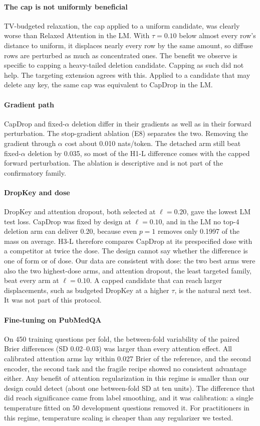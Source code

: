 \paragraph{The cap is not uniformly beneficial}
TV-budgeted relaxation, the cap applied to a uniform candidate, was clearly worse than Relaxed Attention in the LM.
With $\tau=0.10$ below almost every row's distance to uniform, it displaces nearly every row by the same amount, so
diffuse rows are perturbed as much as concentrated ones. The benefit we observe is specific to capping a heavy-tailed
deletion candidate. Capping as such did not help. The targeting extension agrees with this. Applied to a candidate that may delete
any key, the same cap was equivalent to CapDrop in the LM.

\paragraph{Gradient path}
CapDrop and fixed-$\alpha$ deletion differ in their gradients as well as in their forward perturbation. The stop-gradient ablation
(E8) separates the two. Removing the gradient through $\alpha$ cost about 0.010 nats/token. The detached arm still beat fixed-$\alpha$
deletion by 0.035, so most of the H1-L difference comes with the capped forward perturbation. The ablation is descriptive and
is not part of the confirmatory family.

\paragraph{DropKey and dose}
DropKey and attention dropout, both selected at $\ell=0.20$, gave the lowest LM test loss. CapDrop was fixed by
design at $\ell=0.10$, and in the LM no top-4 deletion arm can deliver 0.20, because even $p=1$ removes only 0.1997
of the mass on average. H3-L therefore compares CapDrop at its prespecified dose with a competitor at twice the
dose. The design cannot say whether the difference is one of form or of dose. Our data are consistent with dose: the two best arms were also the two highest-dose arms, and attention
dropout, the least targeted family, beat every arm at $\ell=0.10$. A capped candidate
that can reach larger displacements, such as budgeted DropKey at a higher $\tau$, is the natural next test. It was not part of
this protocol.

\paragraph{Fine-tuning on PubMedQA}
On 450 training questions per fold, the between-fold variability of the paired Brier differences (SD 0.02--0.03) was
larger than every attention effect. All calibrated attention arms lay within 0.027 Brier of the reference, and the
second encoder, the second task and the fragile recipe showed no consistent advantage either. Any benefit of attention
regularization in this regime is smaller than our design could detect (about one between-fold SD at ten units). The
difference that did reach significance came from label smoothing, and it was calibration: a single temperature fitted on 50 development
questions removed it. For practitioners in this regime, temperature scaling is cheaper than any regularizer we tested.

